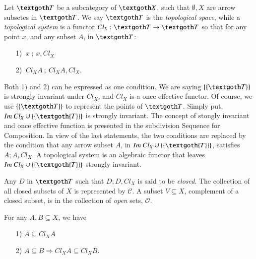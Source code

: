 \documentclass [12pt]{book}
\begin{document}
Let $\textgoth T$ be a subcategory of $\textgoth X$, such that $\emptyset,X$ are arrow subsetes in $\textgoth T$. We say $\textgoth T$ is the \textit{topological space}, while a \textit{topological system} is a functor $Cl_X:\textgoth T\rightarrow\textgoth T$ so that for any point $x$, and any subset $A$, in $\textgoth T$:

\begin{itemize}\item[1)]$~x~;~x,Cl_X$\item[2)]$~Cl_XA~;~Cl_XA,
Cl_X$.\end{itemize}Both 1) and 2) can be expressed as one condition. We are saying $\{\{\textgoth T\}\}$ is strongly invariant under $Cl_X$, and $Cl_X$ is a once effective functor. Of course, we use $\{\{\textgoth T\}\}$ to represent the points of $\textgoth T$. Simply put, $Im~Cl_X\cup\{\{\textgoth{T}\}\}$ is strongly invariant. The concept of stongly invariant and once effective function is presented in the subdivision Sequence for Composition. In view of the last statements, the two conditions are replaced by the condition that any arrow subset $A$, in $Im~Cl_X\cup\{\{\textgoth{T}\}\}$, satisfies $A;A,Cl_X$. A topological system is an algebraic functor that leaves $Im~Cl_X\cup\{\{\textgoth{T}\}\}$ strongly invariant.

Any $D$ in $\textgoth T$ such that $D;D,Cl_X$ is said to be \textit{closed}. The collection of all closed subsets of $X$ is represented by $\mathcal{C}$. A subset $V\subseteq X$, complement of a closed subset, is in the collection of \textit{open} sets, $\mathcal{O}$.

\begin{proposition}For any $A,B\subseteq X$, we have

\begin{itemize}\item[1)]$A\subseteq Cl_XA$\item[2)]$A\subseteq B\Rightarrow Cl_XA\subseteq Cl_XB$.\end{itemize}

\label{topth1}\end{proposition}
\end{document}
